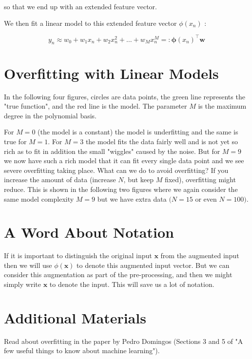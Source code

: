 so that we end up with an extended feature vector.

We then fit a linear model to this extended feature vector $\phi\left(x_{n}\right)$ :

$$
y_{n} \approx w_{0}+w_{1} x_{n}+w_{2} x_{n}^{2}+\ldots+w_{M} x_{n}^{M}=: \boldsymbol{\phi}\left(x_{n}\right)^{\top} \mathbf{w}
$$

\section*{Overfitting with Linear Models}
In the following four figures, circles are data points, the green line represents the "true function", and the red line is the model. The parameter $M$ is the maximum degree in the polynomial basis.

For $M=0$ (the model is a constant) the model is underfitting and the same is true for $M=1$. For $M=3$ the model fits the data fairly well and is not yet so rich as to fit in addition the small "wiggles" caused by the noise. But for $M=9$ we now have such a rich model that it can fit every single data point and we see severe overfitting taking place. What can we do to avoid overfitting? If you increase the amount of data (increase $N$, but keep $M$ fixed), overfitting
might reduce. This is shown in the following two figures where we again consider the same model complexity $M=9$ but we have extra data $(N=15$ or even $N=100)$.

\section*{A Word About Notation}
If it is important to distinguish the original input $\mathbf{x}$ from the augmented input then we will use $\phi(\mathbf{x})$ to denote this augmented input vector. But we can consider this augmentation as part of the pre-processing, and then we might simply write $\mathbf{x}$ to denote the input. This will save us a lot of notation.

\section*{Additional Materials}
Read about overfitting in the paper by Pedro Domingos (Sections 3 and 5 of "A few useful things to know about machine learning").
